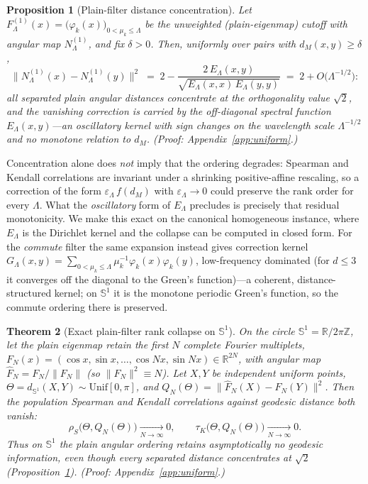 \documentclass[11pt]{article}
\newtheorem{theorem}{Theorem}
\newtheorem{proposition}[theorem]{Proposition}
\theoremstyle{remark}
\begin{document}
\begin{proposition}[Plain-filter distance concentration]\label{prop:plain}
Let $F^{(1)}_\Lambda(x)=\big(\varphi_k(x)\big)_{0<\mu_k\le\Lambda}$ be the
unweighted (plain-eigenmap) cutoff with angular map $N^{(1)}_\Lambda$, and fix
$\delta>0$. Then, uniformly over pairs with $d_M(x,y)\ge\delta$,
\[
\big\lVert N^{(1)}_\Lambda(x)-N^{(1)}_\Lambda(y)\big\rVert^{2}
\;=\;2-\frac{2\,E_\Lambda(x,y)}{\sqrt{E_\Lambda(x,x)\,E_\Lambda(y,y)}}
\;=\;2+O\big(\Lambda^{-1/2}\big):
\]
all separated plain angular distances concentrate at the orthogonality value
$\sqrt2$, and the vanishing correction is carried by the off-diagonal spectral
function $E_\Lambda(x,y)$---an oscillatory kernel with sign changes on the
wavelength scale $\Lambda^{-1/2}$ and no monotone relation to $d_M$. (Proof:
Appendix~\ref{app:uniform}.)
\end{proposition}

\noindent Concentration alone does \emph{not} imply that the ordering degrades:
Spearman and Kendall correlations are invariant under a shrinking positive-affine
rescaling, so a correction of the form $\varepsilon_\Lambda\,f(d_M)$ with
$\varepsilon_\Lambda\to0$ could preserve the rank order for every $\Lambda$. What
the \emph{oscillatory} form of $E_\Lambda$ precludes is precisely that residual
monotonicity. We make this exact on the canonical homogeneous instance, where
$E_\Lambda$ is the Dirichlet kernel and the collapse can be computed in closed
form. For the \emph{commute} filter the same expansion instead gives correction
kernel $G_\Lambda(x,y)=\sum_{0<\mu_k\le\Lambda}\mu_k^{-1}\varphi_k(x)\varphi_k(y)$,
low-frequency dominated (for $d\le3$ it converges off the diagonal to the Green's
function)---a coherent, distance-structured kernel; on $\mathbb S^1$ it is the
monotone periodic Green's function, so the commute ordering there is preserved.

\begin{theorem}[Exact plain-filter rank collapse on $\mathbb S^1$]\label{thm:s1collapse}
On the circle $\mathbb S^1=\mathbb R/2\pi\mathbb Z$, let the plain eigenmap retain
the first $N$ complete Fourier multiplets,
$F_N(x)=(\cos x,\sin x,\dots,\cos Nx,\sin Nx)\in\mathbb R^{2N}$, with angular map
$\widehat F_N=F_N/\lVert F_N\rVert$ (so $\lVert F_N\rVert^2\equiv N$). Let $X,Y$ be
independent uniform points, $\Theta=d_{\mathbb S^1}(X,Y)\sim\mathrm{Unif}[0,\pi]$,
and $Q_N(\Theta)=\lVert\widehat F_N(X)-\widehat F_N(Y)\rVert^2$. Then the population
Spearman and Kendall correlations against geodesic distance both vanish:
\[
\rho_S\big(\Theta,Q_N(\Theta)\big)\xrightarrow[N\to\infty]{}0,
\qquad
\tau_K\big(\Theta,Q_N(\Theta)\big)\xrightarrow[N\to\infty]{}0 .
\]
Thus on $\mathbb S^1$ the plain angular ordering retains asymptotically no
geodesic information, even though every separated distance concentrates at
$\sqrt2$ (Proposition~\ref{prop:plain}). (Proof: Appendix~\ref{app:uniform}.)
\end{theorem}
\end{document}
